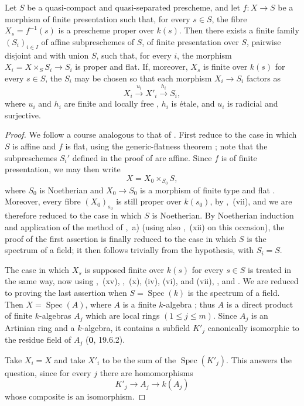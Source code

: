 \begin{proposition}[17.16.6]
\label{IV.17.16.6}
Let $S$ be a quasi-compact and quasi-separated prescheme, and let $f:X\to S$ be a morphism of finite presentation such that, for every $s\in S$, the fibre $X_s=f^{-1}(s)$ is a prescheme proper over $k(s)$.
Then there exists a finite family $(S_i)_{i\in I}$ of affine subpreschemes of $S$, of finite presentation over $S$, pairwise disjoint and with union $S$, such that, for every $i$, the morphism $X_i=X\times_S S_i\to S_i$ is proper and flat.
If, moreover, $X_s$ is finite over $k(s)$ for every $s\in S$, the $S_i$ may be chosen so that each morphism $X_i\to S_i$ factors as
\[
 X_i \xrightarrow{u_i} X'_i \xrightarrow{h_i} S_i,
\]
where $u_i$ and $h_i$ are finite and locally free , $h_i$ is \'etale, and $u_i$ is radicial and surjective.
\end{proposition}

\begin{proof}
We follow a course analogous to that of .  First reduce to the case in which $S$ is affine and $f$ is flat, using the generic-flatness theorem ; note that the subpreschemes $S_i'$ defined in the proof of  are affine.  Since $f$ is of finite presentation, we may then write
\[
 X=X_0\times_{S_0}S,
\]
where $S_0$ is Noetherian and $X_0\to S_0$ is a morphism of finite type and flat .  Moreover, every fibre $(X_0)_{s_0}$ is still proper over $k(s_0)$, by ,~(vii), and we are therefore reduced to the case in which $S$ is Noetherian.  By Noetherian induction and application of the method of ,~a) (using also ,~(xii) on this occasion), the proof of the first assertion is finally reduced to the case in which $S$ is the spectrum of a field; it then follows trivially from the hypothesis, with $S_i=S$.

The case in which $X_s$ is supposed finite over $k(s)$ for every $s\in S$ is treated in the same way, now using ,~(xv), ,~(x), (iv), (vi), and (vii), , and .  We are reduced to proving the last assertion when $S=\operatorname{Spec}(k)$ is the spectrum of a field.  Then $X=\operatorname{Spec}(A)$, where $A$ is a finite $k$-algebra ; thus $A$ is a direct product of finite $k$-algebras $A_j$ which are local rings $(1\leq j\leq m)$.  Since $A_j$ is an Artinian ring and a $k$-algebra, it contains a subfield $K'_j$ canonically isomorphic to the residue field of $A_j$ ($\mathbf{0}$, 19.6.2).


Take $X_i=X$ and take $X'_i$ to be the sum of the $\operatorname{Spec}(K'_j)$.  This answers the question, since for every $j$ there are homomorphisms
\[
 K'_j\longrightarrow A_j\longrightarrow k(A_j)
\]
whose composite is an isomorphism.
\end{proof}
